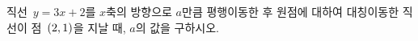 직선~$y=3x+2$를 $x$축의 방향으로 $a$만큼 평행이동한 후 원점에 대하여 대칭이동한 직선이 점~$(2{,}\mkern3mu\mathopen{}1)$을 지날 때, $a$의 값을 구하시오.
